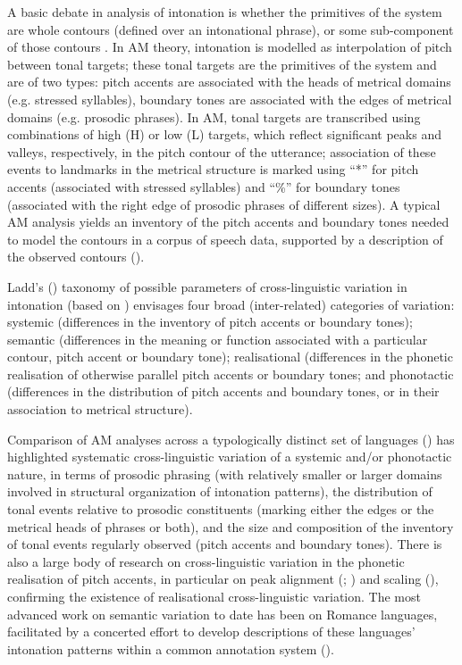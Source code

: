 \documentclass[output=paper]{langsci/langscibook}
\begin{document}
A basic debate in analysis of intonation is whether the primitives of the system are whole contours (defined over an intonational phrase), or some sub-component of those contours \citep{Ladd2008}. In AM theory, intonation is modelled as interpolation of pitch between tonal targets; these tonal targets are the primitives of the system and are of two types: pitch accents are associated with the heads of metrical domains (e.g. stressed syllables), boundary tones are associated with the edges of metrical domains (e.g. prosodic phrases). In AM, tonal targets are transcribed using combinations of high (H) or low (L) targets, which reflect significant peaks and valleys, respectively, in the pitch contour of the utterance; association of these events to landmarks in the metrical structure is marked using ``*'' for pitch accents (associated with stressed syllables) and ``\%'' for boundary tones (associated with the right edge of prosodic phrases of different sizes). A typical AM analysis yields an inventory of the pitch accents and boundary tones needed to model the contours in a corpus of speech data, supported by a description of the observed contours (\citealt{JunFletcher2015}).

Ladd's (\citeyear{Ladd2008}) taxonomy of possible parameters of cross-linguistic variation in intonation (based on \citealt{Wells1982}) envisages four broad (inter-related) categories of variation: systemic (differences in the inventory of pitch accents or boundary tones); semantic (differences in the meaning or function associated with a particular contour, pitch accent or boundary tone); realisational (differences in the phonetic realisation of otherwise parallel pitch accents or boundary tones; and phonotactic (differences in the distribution of pitch accents and boundary tones, or in their association to metrical structure). 

Comparison of AM analyses across a typologically distinct set of languages (\citealt{Jun2005,Jun2015}) has highlighted systematic cross-linguistic variation of a systemic and/or phonotactic nature, in terms of prosodic phrasing (with relatively smaller or larger domains involved in structural organization of intonation patterns), the distribution of tonal events relative to prosodic constituents (marking either the edges or the metrical heads of phrases or both), and the size and composition of the inventory of tonal events regularly observed (pitch accents and boundary tones). There is also a large body of research on cross-linguistic variation in the phonetic realisation of pitch accents, in particular on peak alignment (\citealt{AttererLadd2004}; \citealt{Ladd2006}) and scaling (\citealt{LaddMorton1997}), confirming the existence of realisational cross-linguistic variation. The most advanced work on semantic variation to date has been on Romance languages, facilitated by a concerted effort to develop descriptions of these languages' intonation patterns within a common annotation system (\citealt{FrotaPrieto2015}). 
\end{document}
